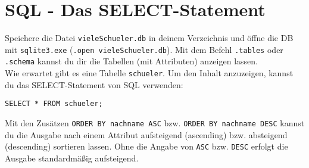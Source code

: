 \section[SELECT-Statement]{SQL - Das SELECT-Statement}
Speichere die Datei \texttt{vieleSchueler.db} in deinem Verzeichnis und öffne die DB mit \texttt{sqlite3.exe} (\lstinline!.open vieleSchueler.db!). Mit dem Befehl \lstinline!.tables! oder \lstinline!.schema! kannst du dir die Tabellen (mit Attributen) anzeigen lassen.\\
Wie erwartet gibt es eine Tabelle \lstinline!schueler!. Um den Inhalt anzuzeigen, kannst du das SELECT-Statement von SQL verwenden:
\begin{tcolorbox}[title=SELECT-Statement]
	\lstinline!SELECT * FROM schueler;!
\end{tcolorbox}
Mit den Zusätzen \lstinline!ORDER BY nachname ASC! bzw. \lstinline!ORDER BY nachname DESC!  kannst du die Ausgabe nach einem Attribut aufsteigend (ascending) bzw. absteigend (descending) sortieren lassen. Ohne die Angabe von \lstinline!ASC! bzw. \lstinline!DESC! erfolgt die Ausgabe standardmäßig aufsteigend.

